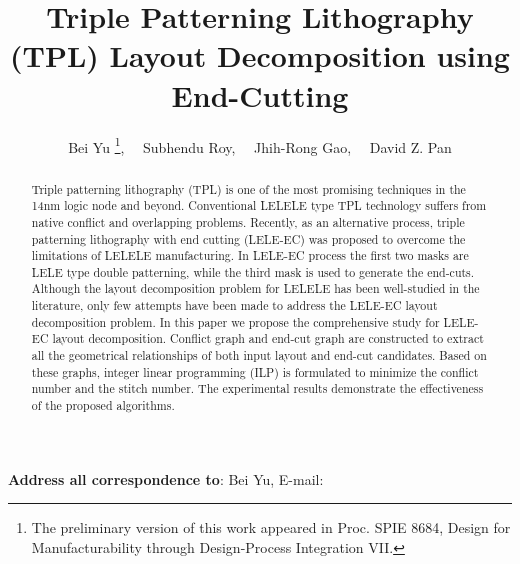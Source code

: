 \documentclass[12pt]{spieman}
\theoremstyle{plain}
\begin{document}
 


\title{
  Triple Patterning Lithography (TPL) Layout Decomposition using End-Cutting
}

\author{
  Bei Yu
  \footnote{The preliminary version of this work appeared in Proc. SPIE 8684, Design for Manufacturability through Design-Process Integration VII.},
  \ \ Subhendu Roy, \ \ Jhih-Rong Gao, \ \ David Z. Pan
}


\maketitle 

\begin{abstract}
Triple patterning lithography (TPL) is one of the most promising techniques in the 14nm logic node and beyond.
Conventional LELELE type TPL technology suffers from native conflict and overlapping problems.
Recently, as an alternative process, triple patterning lithography with end cutting (LELE-EC) was proposed to overcome the limitations of LELELE manufacturing.
In LELE-EC process the first two masks are LELE type double patterning,
while the third mask is used to generate the end-cuts.
Although the layout decomposition problem for LELELE has been well-studied in the literature,
only few attempts have been made to address the LELE-EC layout decomposition problem.
In this paper we propose the comprehensive study for LELE-EC layout decomposition.
Conflict graph and end-cut graph are constructed to extract all the geometrical relationships of both input layout and end-cut candidates.
Based on these graphs, integer linear programming (ILP) is formulated to minimize the conflict number and the stitch number.
The experimental results demonstrate the effectiveness of the proposed algorithms.
\end{abstract}



{\noindent
\footnotesize
{\bf Address all correspondence to}:
Bei Yu,
E-mail:  
}
\end{document}
